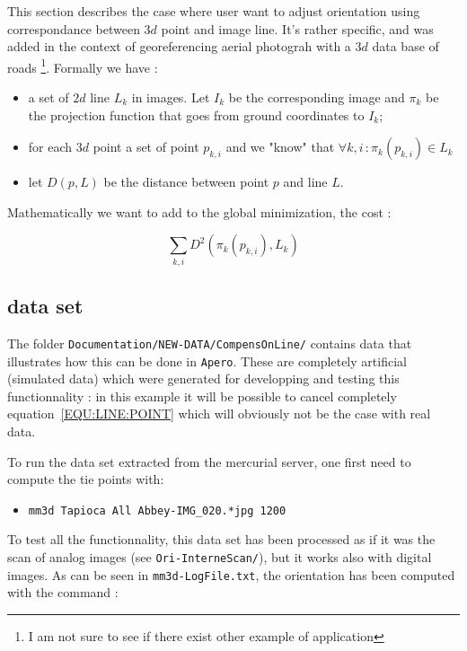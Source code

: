 This section describes the case where user want to adjust orientation using correspondance between $3d$ point
and image line. It's rather specific, and was added in the context of  georeferencing aerial photograh with a $3d$ 
data base of roads \footnote{I am not sure to see if there exist other example of application}. Formally we have :

\begin{itemize}
    \item a set of $2d$ line $L_k$ in images. Let $I_k$ be the corresponding image and $\pi_k$ be the projection
         function that goes from ground coordinates to $I_k$;
    \item for each $3d$ point a set of point $p_{k,i}$ and we "know" that $\forall k,i \, : \pi_k (p_{k,i}) \in L_k $
    \item let $D(p,L)$ be the distance between point $p$ and line $L$.
\end{itemize}

Mathematically we want to add to the global minimization, the cost :

\begin{equation}
    \sum_{k,i} D^2 ( \pi_k(p_{k,i}),L_k) \label{EQU:LINE:POINT}
\end{equation}



\subsection{data set}

The folder {\tt Documentation/NEW-DATA/CompensOnLine/} contains  data that illustrates how this can be done in 
{\tt Apero}. These are completely artificial (simulated data) which were generated for developping and testing this functionnality : in this example it will be possible to cancel completely equation~\ref{EQU:LINE:POINT} which will obviously not
be the case with real data.  

To run the data set extracted from the mercurial server, one first need to compute the tie points with:

\begin{itemize}
   \item {\tt mm3d Tapioca All Abbey-IMG\_020.*jpg 1200}
\end{itemize}

To test all the functionnality, this data set has been processed as if it was the scan of analog images
(see {\tt Ori-InterneScan/}), but it works also with digital images. As can be seen in {\tt mm3d-LogFile.txt},
the orientation has been computed with the command :

